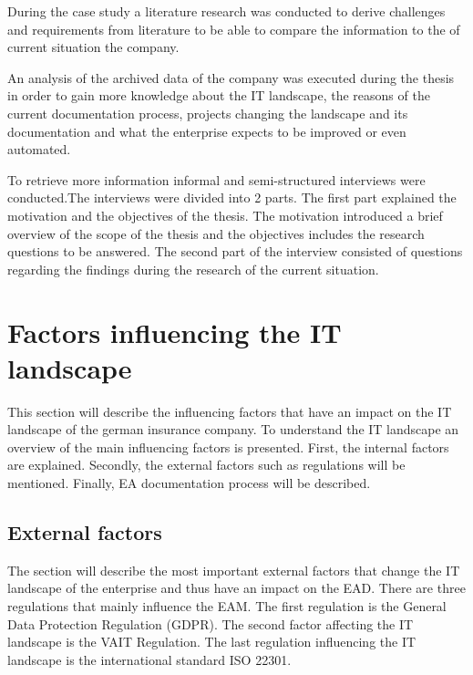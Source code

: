 
During the case study a literature research was conducted to derive challenges and requirements from literature to be able to compare the information to the of current situation the company.

An analysis of the archived data of the company was executed during the thesis in order to gain more knowledge about the IT landscape, the reasons of the current documentation process, projects changing the landscape and its documentation and what the enterprise expects to be improved or even automated.

To retrieve more information informal and semi-structured interviews were conducted.The interviews were divided into 2 parts. The first part explained the motivation and the objectives of the thesis. The motivation introduced a brief overview of the scope of the thesis and the objectives includes the research questions to be answered. The second part of the interview consisted of questions regarding the findings during the research of the current situation.

\section{Factors influencing the IT landscape}\label{section:influencingfactors}

This section will describe the influencing factors that have an impact on the IT landscape of the german insurance company. To understand the IT landscape an overview of the main influencing factors is presented. First, the internal factors are explained. Secondly, the external factors such as regulations will be mentioned. Finally, EA documentation process will be described. 

\subsection{External factors}\label{subsection:externalinfluencingfactors}

The section will describe the most important external factors that change the IT landscape of the enterprise and thus have an impact on the EAD. There are three regulations that mainly influence the EAM. The first regulation is the General Data Protection Regulation (GDPR). The second factor affecting the IT landscape is the VAIT Regulation. The last regulation influencing the IT landscape is the international standard ISO 22301.

